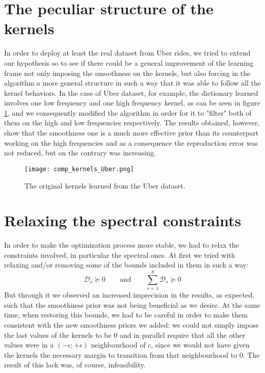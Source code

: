 \section{The peculiar structure of the kernels}
 In order to deploy at least the real dataset from Uber rides, we tried to extend our hypothesis so to see if there could be a general improvement of the learning frame not only imposing the smoothness on the kernels, but also forcing in the algorithm a more general structure in such a way that it was able to follow all the kernel behaviors. In the case of Uber dataset, for example, the dictionary learned involves one low frequency and one high frequency kernel, as can be seen in figure \ref{fig:uber}, and we consequently modified the algorithm in order for it to "filter" both of them on the high and low frequencies respectively. The results obtained, however, show that the smoothness one is a much more effective prior than its counterpart working on the high frequencies and as a consequence the reproduction error was not reduced, but on the contrary was increasing.

 \begin{figure}[tb]
   \centering
   \texttt{[image: comp\_kernels\_Uber.png]}
   \caption{The original kernels learned from the Uber dataset.}
   \label{fig:uber}
 \end{figure}

 \section{Relaxing the spectral constraints}
In order to make the optimization process more stable, we had to relax the constraints involved, in particular the spectral ones. At first we tried with relaxing and/or removing some of the bounds included in them in such a way:
\begin{equation}
\mathcal{D}_s \succeq 0 \qquad \text{and} \qquad \sum_{s=1}^S\mathcal{D}_s \succeq 0
\end{equation}
But through it we observed an increased imprecision in the results, as expected, such that the smoothness prior was not being beneficial as we desire. At the same time, when restoring this bounds, we had to be careful in order to make them consistent with the new smoothness priors we added: we could not simply impose the last values of the kernels to be $0$ and in parallel require that all the other values were in a $(-\epsilon;+\epsilon)$ neighbourhood of $c$, since we would not have given the kernels the necessary margin to transition from that neighbourhood to $0$. The result of this lack was, of course, infeasibility.
